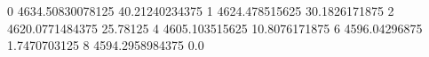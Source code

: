 0 4634.50830078125 40.21240234375
1 4624.478515625 30.1826171875
2 4620.0771484375 25.78125
4 4605.103515625 10.8076171875
6 4596.04296875 1.7470703125
8 4594.2958984375 0.0
